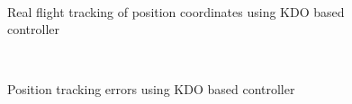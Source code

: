 \documentclass[letterpaper%
, twoside%
, 12pt%
,memoire%
, english%
,creativecommons,hyperref%
]{thETS}
\begin{document}
\begin{figure}[H]
	\centering
	 \\ \parbox{0.75\textwidth}{\caption{Real flight tracking of position coordinates using KDO based controller\label{Fig:xyztracKDO}}}
\end{figure}

\begin{figure}[H]
	\centering
	 \\ \parbox{0.75\textwidth}{\caption{Position tracking errors using KDO based controller\label{Fig:xyzerrKDO}}}
\end{figure}
\end{document}
